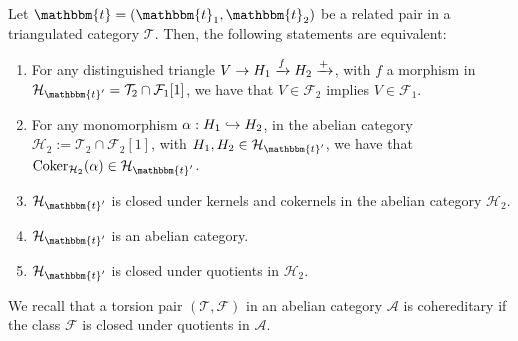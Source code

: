 \begin{corollary}
  Let $\mathbbm{t}=(\mathbbm{t}_1,\mathbbm{t}_2)$ be a related pair in a triangulated category
  $\mathcal{T}$. Then, the following statements are equivalent:
  \begin{enumerate}[label=(\alph*)]
    \item For any distinguished triangle $V\to H_1\xrightarrow{f}H_2\xrightarrow{+}$, with
    $f$ a morphism in $\mathcal{H}_{\mathbbm{t}'}=\mathcal{T}_2\cap\mathcal{F}_1[1]$,
    we have that $V\in\mathcal{F}_2$ implies $V\in\mathcal{F}_1$.
    \item For any monomorphism $\alpha:H_1\hookrightarrow H_2$, in the abelian category
    $\mathcal{H}_2:=\mathcal{T}_2\cap\mathcal{F}_2[1]$, with $H_1,H_2\in\mathcal{H}_{\mathbbm{t}'}$,
    we have that $\Coker_{\mathcal{H}_2}(\alpha)\in\mathcal{H}_{\mathbbm{t}'}$.
    \item $\mathcal{H}_{\mathbbm{t}'}$ is closed under kernels and cokernels in
    the abelian category $\mathcal{H}_2$.
    \item $\mathcal{H}_{\mathbbm{t}'}$ is an abelian category.
    \item $\mathcal{H}_{\mathbbm{t}'}$ is closed under quotients in $\mathcal{H}_2$.
  \end{enumerate}
\end{corollary}

We recall that a torsion pair $(\mathcal{T},\mathcal{F})$ in an abelian category
$\mathcal{A}$ is cohereditary if the class $\mathcal{F}$ is closed under quotients
in $\mathcal{A}$.

